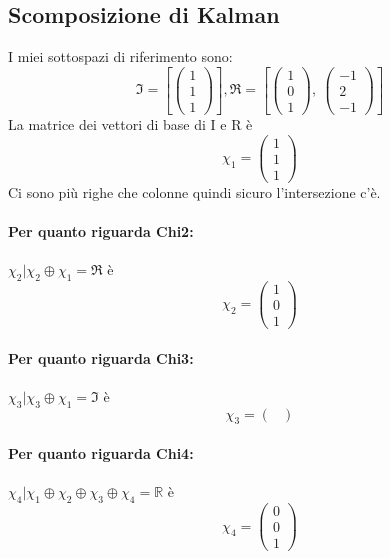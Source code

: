 \documentclass{article}
\begin{document}
\subsection{Scomposizione di Kalman}
I miei sottospazi di riferimento sono:	\[ \mathfrak{I} = \left[ \left(\begin{matrix}1\\1\\1\end{matrix}\right)\right], \mathfrak{R} = \left[ \left(\begin{matrix}1\\0\\1\end{matrix}\right), \  \left(\begin{matrix}-1\\2\\-1\end{matrix}\right)\right] \]
La matrice dei vettori di base di I e R è \[ \chi_1 =  \left(\begin{matrix}1\\1\\1\end{matrix}\right) \]
Ci sono più righe che colonne quindi sicuro l'intersezione c'è.

\paragraph{Per quanto riguarda Chi2:} $ \chi_2 | \chi_2 \oplus \chi_1 = \mathfrak{R} $ è \[ \chi_2 = \left(\begin{matrix}1\\0\\1\end{matrix}\right) \]

\paragraph{Per quanto riguarda Chi3:} $ \chi_3 | \chi_3 \oplus \chi_1 = \mathfrak{I} $ è \[ \chi_3 = \left(\begin{matrix}\end{matrix}\right) \]

\paragraph{Per quanto riguarda Chi4:} $ \chi_4 | \chi_1 \oplus \chi_2 \oplus  \chi_3 \oplus \chi_4 = \mathbb{R} $ è \[ \chi_4 = \left(\begin{matrix}0\\0\\1\end{matrix}\right) \]
\end{document}
